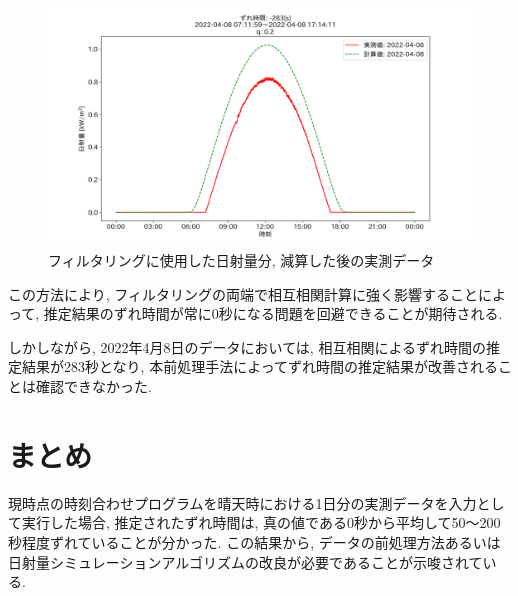 \documentclass[a4j,12pt,]{jarticle}
\begin{document}
\begin{figure}[H]
  \begin{center}
    \includegraphics[width=160mm]{2022-04-08_mask_by_q_corr.png}
    \caption{フィルタリングに使用した日射量分, 減算した後の実測データ}
    \label{p10}
  \end{center}
\end{figure}

この方法により, フィルタリングの両端で相互相関計算に強く影響することによって, 推定結果のずれ時間が常に0秒になる問題を回避できることが期待される.

しかしながら, 2022年4月8日のデータにおいては, 相互相関によるずれ時間の推定結果が283秒となり, 本前処理手法によってずれ時間の推定結果が改善されることは確認できなかった.

\section{まとめ}
現時点の時刻合わせプログラムを晴天時における1日分の実測データを入力として実行した場合, 推定されたずれ時間は, 真の値である0秒から平均して50〜200秒程度ずれていることが分かった. この結果から, データの前処理方法あるいは日射量シミュレーションアルゴリズムの改良が必要であることが示唆されている.

\end{document}
